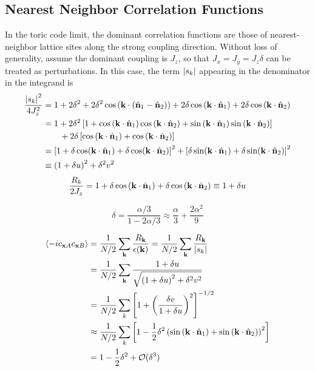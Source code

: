 \subsection{Nearest Neighbor Correlation Functions}
In the toric code limit, the dominant correlation functions are those of nearest-neighbor lattice sites along the strong coupling direction. Without loss of generality, assume the dominant coupling is $J_z$, so that $J_x = J_y = J_z \delta$ can be treated as perturbations. In this case, the term $\left| s_k \right|$ appearing in the denominator in the integrand is
\begin{align}
    \frac{\left| s_k \right|^2}{4 J_z^2}
    &=
    1 + 2\delta^2 + 2\delta^2 \cos\left( \mathbf{k}\cdot\left( \hat{\mathbf{n}}_1 - \hat{\mathbf{n}}_2 \right) \right) + 2\delta \cos\left( \mathbf{k}\cdot\hat{\mathbf{n}}_1 \right) + 2\delta \cos\left( \mathbf{k}\cdot\hat{\mathbf{n}}_2 \right) \nonumber \\
    &= 
    1 + 
    2\delta^2\left[ 
    1 + \cos\left( \mathbf{k}\cdot\hat{\mathbf{n}}_1 \right) \cos\left( \mathbf{k}\cdot\hat{\mathbf{n}}_2 \right)
    +
    \sin\left( \mathbf{k}\cdot\hat{\mathbf{n}}_1 \right)
    \sin\left( \mathbf{k}\cdot\hat{\mathbf{n}}_2 \right)
     \right] \nonumber \\
    &\qquad+
    2\delta\left[ 
    \cos\left( \mathbf{k}\cdot\hat{\mathbf{n}}_1 \right)
    +
    \cos\left( \mathbf{k}\cdot\hat{\mathbf{n}}_2 \right)
     \right] \nonumber \\
    &=
    \left[ 1 + \delta \cos(\mathbf{k}\cdot\hat{\mathbf{n}}_1)
    +
    \delta \cos(\mathbf{k}\cdot\hat{\mathbf{n}}_2)
     \right]^2
    +
    \left[ 
    \delta \sin(\mathbf{k}\cdot\hat{\mathbf{n}}_1)
    +
    \delta \sin(\mathbf{k}\cdot\hat{\mathbf{n}}_2)
     \right]^2 \nonumber \\
    &\equiv \left( 1 + \delta u \right)^2 + \delta^2v^2
\end{align}
\begin{equation}
    \frac{R_k}{2J_z}
    =
    1 
    +
    \delta \cos\left( \mathbf{k}\cdot \hat{\mathbf{n}}_1 \right) 
    + 
    \delta \cos\left( \mathbf{k}\cdot\hat{\mathbf{n}}_2 \right)
    \equiv
    1 + \delta u
\end{equation}

\[
\delta
=
\frac{\alpha/3}{1 - 2\alpha/3}
\approx
\frac{\alpha}{3}
+
\frac{2\alpha^2}{9}
\]


\begin{align*}
    \langle -ic_{\mathbf{x}A}c_{\mathbf{x}B} \rangle 
    &=
    \frac{1}{N/2}
    \sum_{\mathbf{k}}
    \frac{R_{\mathbf{k}}}{\epsilon(\mathbf{k})} 
    =
    \frac{1}{N/2}
    \sum_{\mathbf{k}}
    \frac{R_{\mathbf{k}}}{\left| s_k \right|} \\
    &=
    \frac{1}{N/2}
    \sum_{\mathbf{k}}
    \frac{1 + \delta u}
    {\sqrt{
    \left( 1+\delta u \right)^2 + \delta^2 v^2
    }} \\
    &=
    \frac{1}{N/2}
    \sum_{k} 
    \left[ 
    1 + 
    \left( 
        \frac{\delta v}{1 + \delta u}
     \right)^2
     \right]^{-1/2} \\
    &\approx
    \frac{1}{N/2}
    \sum_{k} 
    \left[ 
    1 - 
    \frac{1}{2}\delta^2 
    \left( 
    \sin\left( \mathbf{k}\cdot\hat{\mathbf{n}}_1 \right) + 
    \sin\left( \mathbf{k}\cdot\hat{\mathbf{n}}_2 \right)
     \right)^2
     \right] \\
    &=
    1 -
    \frac{1}{2}\delta^2
    +
    \mathcal{O}(\delta^3)
\end{align*}

